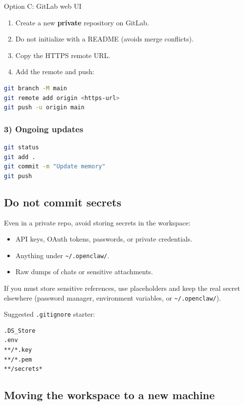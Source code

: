 Option C: GitLab web UI

\begin{enumerate}
  \item Create a new \textbf{private} repository on GitLab.
  \item Do not initialize with a README (avoids merge conflicts).
  \item Copy the HTTPS remote URL.
  \item Add the remote and push:
\end{enumerate}


\begin{lstlisting}[language=bash]
git branch -M main
git remote add origin <https-url>
git push -u origin main
\end{lstlisting}


\subsubsection{3) Ongoing updates}


\begin{lstlisting}[language=bash]
git status
git add .
git commit -m "Update memory"
git push
\end{lstlisting}


\subsection{Do not commit secrets}


Even in a private repo, avoid storing secrets in the workspace:

\begin{itemize}
  \item API keys, OAuth tokens, passwords, or private credentials.
  \item Anything under \texttt{\textasciitilde{}/.openclaw/}.
  \item Raw dumps of chats or sensitive attachments.
\end{itemize}


If you must store sensitive references, use placeholders and keep the real
secret elsewhere (password manager, environment variables, or \texttt{\textasciitilde{}/.openclaw/}).

Suggested \texttt{.gitignore} starter:

\begin{lstlisting}
.DS_Store
.env
**/*.key
**/*.pem
**/secrets*
\end{lstlisting}


\subsection{Moving the workspace to a new machine}


